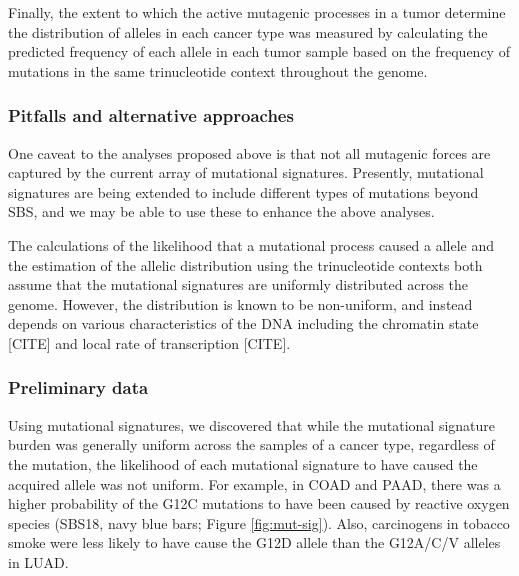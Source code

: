 Finally, the extent to which the active mutagenic processes in a tumor determine the distribution of \KRAS{} alleles in each cancer type was measured by calculating the predicted frequency of each allele in each tumor sample based on the frequency of mutations in the same trinucleotide context throughout the genome.


\subsubsection*{Pitfalls and alternative approaches}

One caveat to the analyses proposed above is that not all mutagenic forces are captured by the current array of mutational signatures.
Presently, mutational signatures are being extended to include different types of mutations beyond SBS, and we may be able to use these to enhance the above analyses.

The calculations of the likelihood that a mutational process caused a \KRAS{} allele and the estimation of the allelic distribution using the trinucleotide contexts both assume that the mutational signatures are uniformly distributed across the genome.
However, the distribution is known to be non-uniform, and instead depends on various characteristics of the DNA including the chromatin state [CITE] and local rate of transcription [CITE].


\subsubsection*{Preliminary data}

Using mutational signatures, we discovered that while the mutational signature burden was generally uniform across the samples of a cancer type, regardless of the \KRAS{} mutation, the likelihood of each mutational signature to have caused the acquired allele was not uniform.
For example, in COAD and PAAD, there was a higher probability of the \KRAS{} G12C mutations to have been caused by reactive oxygen species (SBS18, navy blue bars; Figure \ref{fig:mut-sig}).
Also, carcinogens in tobacco smoke were less likely to have cause the G12D allele than the G12A/C/V alleles in LUAD.

